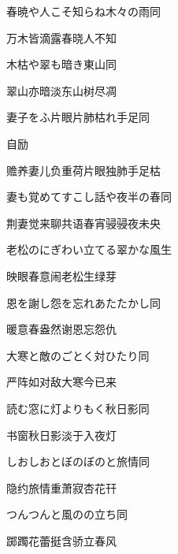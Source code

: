\begin{haiku}
    {\FH 春暁や人こそ知らね木々の雨}\hfill{\FH 同}

    {\FK 万木皆滴露春晓人不知}
\end{haiku}

\begin{haiku}
    {\FH 木枯や翠も暗き東山}\hfill{\FH 同}

    {\FK 翠山亦暗淡东山树尽凋}
\end{haiku}

\begin{haiku}
    {\FH 妻子をふ片眼片肺枯れ手足}\hfill{\FH 同}

    {\FK 自励}

    {\FK 赡养妻儿负重荷片眼独肺手足枯}
\end{haiku}

\begin{haiku}
    {\FH 妻も覚めてすこし話や夜半の春}\hfill{\FH 同}

    {\FK 荆妻觉来聊共语春宵骎骎夜未央}
\end{haiku}

\begin{haiku}
    {\FH 老松のにぎわい立てる翠かな}\hfill{\FH 風生}

    {\FK 映眼春意闹老松生绿芽}
\end{haiku}

\begin{haiku}
    {\FH 恩を謝し怨を忘れあたたかし}\hfill{\FH 同}

    {\FK 暖意春盎然谢恩忘怨仇}
\end{haiku}

\begin{haiku}
    {\FH 大寒と敵のごとく対ひたり}\hfill{\FH 同}

    {\FK 严阵如对敌大寒今已来}
\end{haiku}

\begin{haiku}
    {\FH 読む窓に灯よりもく秋日影}\hfill{\FH 同}

    {\FK 书窗秋日影淡于入夜灯}
\end{haiku}

\begin{haiku}
    {\FH しおしおとぼのぼのと旅情}\hfill{\FH 同}

    {\FK 隐约旅情重萧寂杏花幵}
\end{haiku}

\begin{haiku}
    {\FH つんつんと風のの立ち}\hfill{\FH 同}

    {\FK 踯躅花蕾挺含骄立春风}
\end{haiku}

